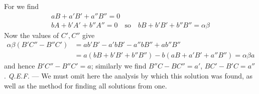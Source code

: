 For we find
\[
\begin{gathered}
aB+a'B'+a''B''=0\\
bA+b'A'+b''A''=0\quad\text{so}\quad bB+b'B'+b''B''=\alpha\beta
\end{gathered}
\]
Now the values of $C',C''$ give
\[
\begin{aligned}
\alpha\beta(B'C''-B''C')
&=ab'B'-a'bB'-a''bB''+ab''B''\\
&=a(bB+b'B'+b''B'')-b(aB+a'B'+a''B'')=\alpha\beta a
\end{aligned}
\]
and hence $B'C''-B''C'=a$; similarly we find $B''C-BC''=a'$, $BC'-B'C=a''$. \textit{Q.E.F.} --- We must omit here the analysis by which this solution was found, as well as the method for finding all solutions from one.
